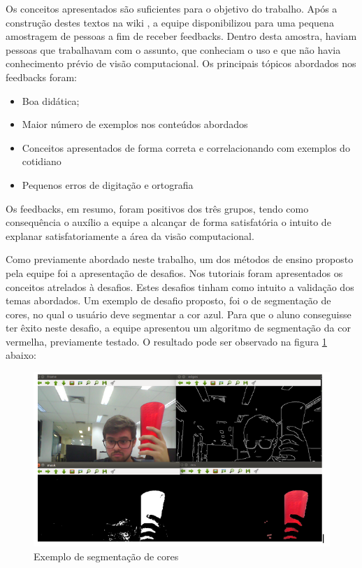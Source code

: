 Os conceitos apresentados são suficientes para o objetivo do trabalho. Após a construção destes textos na wiki \cite{tutVis}, a equipe disponibilizou para uma pequena amostragem de pessoas a fim de receber feedbacks. Dentro desta amostra, haviam pessoas que trabalhavam com o assunto, que conheciam o uso e que não havia conhecimento prévio de visão computacional. Os principais tópicos abordados nos feedbacks foram:

\begin{itemize}
	\item Boa didática;
	\item Maior número de exemplos nos conteúdos abordados
	\item Conceitos apresentados de forma correta e correlacionando com exemplos do cotidiano
	\item Pequenos erros de digitação e ortografia
\end{itemize}

Os feedbacks, em resumo, foram positivos dos três grupos, tendo como consequência o auxílio a equipe a alcançar de forma satisfatória o intuito de explanar satisfatoriamente a área da visão computacional.

Como previamente abordado neste trabalho, um dos métodos de ensino proposto pela equipe foi a apresentação de desafios. Nos tutoriais foram apresentados os conceitos atrelados à desafios. Estes desafios tinham como intuito a validação dos temas abordados. Um exemplo de desafio proposto, foi o de segmentação de cores, no qual o usuário deve segmentar a cor azul. Para que o aluno conseguisse ter êxito neste desafio, a equipe apresentou  um algoritmo de segmentação da cor vermelha, previamente testado. O resultado pode ser observado na figura \ref{fig:vermelho} abaixo:

\begin{figure}[H]
	\centering
	\includegraphics[scale=0.75, angle=0]{Figures/vermelho.png}
	\caption{Exemplo de segmentação de cores}
	\label{fig:vermelho}
\end{figure}

